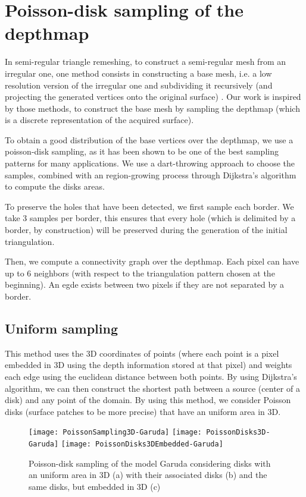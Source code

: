 \documentclass[11pt,fleqn]{book} %
\begin{document}
\section{Poisson-disk sampling of the depthmap}
\label{sec:poisson_sampling}

In semi-regular triangle remeshing, to construct a semi-regular mesh from an irregular one, one method consists in constructing a base mesh, i.e. a low resolution version of the irregular one and subdividing it recursively (and projecting the generated vertices onto the original surface) \cite{PRS15}. Our work is inspired by those methods, to construct the base mesh by sampling the depthmap (which is a discrete representation of the acquired surface).

To obtain a good distribution of the base vertices over the depthmap, we use a poisson-disk sampling, as it has been shown to be one of the best sampling patterns for many applications. 
We use a dart-throwing approach to choose the samples, combined with an region-growing process through Dijkstra's algorithm \cite{Dij59} to compute the disks areas.

To preserve the holes that have been detected, we first sample each border. We take 3 samples per border, this ensures that every hole (which is delimited by a border, by construction) will be preserved during the generation of the initial triangulation.

Then, we compute a connectivity graph over the depthmap. Each pixel can have up to 6 neighbors (with respect to the triangulation pattern chosen at the beginning).
An egde exists between two pixels if they are not separated by a border.

\subsection{Uniform sampling}
This method uses the 3D coordinates of points (where each point is a pixel embedded in 3D using the depth information stored at that pixel) and weights each edge using the euclidean distance between both points.
By using Dijkstra's algorithm, we can then construct the shortest path between a source (center of a disk) and any point of the domain. 
By using this method, we consider Poisson disks (surface patches to be more precise) that have an uniform area in 3D.

\begin{figure}[ht]
\centering
\texttt{[image: PoissonSampling3D-Garuda]}
\texttt{[image: PoissonDisks3D-Garuda]}
\texttt{[image: PoissonDisks3DEmbedded-Garuda]}
\caption{Poisson-disk sampling of the model Garuda considering disks with an uniform area in 3D (a) with their associated disks (b) and the same disks, but embedded in 3D (c)}
\label{fig:poisson_sampling_3d}
\end{figure}
\end{document}
